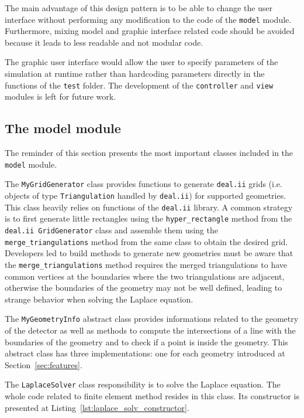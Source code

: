 \documentclass[11pt]{article}
\begin{document}
		The main advantage of this design pattern is to be able to change the user interface without
		performing any modification to the code of the \texttt{model} module. Furthermore,
		mixing model and graphic interface related code should be avoided because it leads to
		less readable and not modular code.

		The graphic user interface would allow the user to specify
		parameters of the simulation at runtime rather than hardcoding parameters
		directly in the functions of the \texttt{test} folder.
		The development of the \texttt{controller} and \texttt{view} modules
		is left for future work.

	\subsection{The model module}

		The reminder of this section presents the most important classes
		included in the \texttt{model} module.



		The \texttt{MyGridGenerator} class provides functions to generate \texttt{deal.ii}
		grids (i.e. objects of type \texttt{Triangulation} handled by \texttt{deal.ii}) for supported
		geometries. This class heavily relies on functions of the \texttt{deal.ii}
		library. A common strategy is to first generate
		little rectangles using the \lstinline{hyper_rectangle} method from the
		\texttt{deal.ii GridGenerator} class and assemble them using the \lstinline{merge_triangulations}
		method from the same class to obtain the desired grid. Developers led to build
		methods to generate
		new geometries must be aware that the \lstinline{merge_triangulations} method
		requires the merged triangulations to have common vertices at the boundaries
		where the two triangulations are adjacent, otherwise
		the boundaries of the geometry may not be well defined, leading to strange behavior
		when solving the Laplace equation.

		The \texttt{MyGeometryInfo} abstract class provides informations
		related to the
		geometry of the detector as well as methods to compute the intersections of a
		line with the boundaries of the geometry and to check if a point is inside
		the geometry. This abstract class has three implementations: one for each
		geometry introduced at Section~\ref{sec:features}.

		The \texttt{LaplaceSolver} class responsibility is to solve the Laplace equation.
		The whole code related to finite element method resides in this class.
		Its constructor is presented at Listing~\ref{lst:laplace_solv_constructor}.
		\newline
\end{document}
